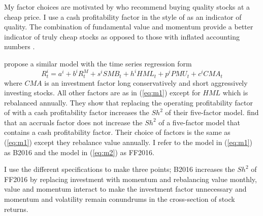 My factor choices are motivated by \textcite{graham1934security} who recommend buying
quality stocks at a cheap price. I use a cash profitability factor in the style of
\textcite{ball2016accruals} as an indicator of quality. The combination of fundamental
value and momentum provide a better indicator of truly cheap stocks as opposed to those
with inflated accounting numbers \textcite{kok2017facts}.

\textcite{fama2016choosing} propose a similar model with the time series regression form
\begin{equation} \label{eq:m2} R_t^i=a^i+b^iR_t^M+s^iSMB_t+h^iHML_t+p^iPMU_t+c^iCMA_t
\end{equation} where $CMA$ is an investment factor long conservatively and short
aggressively investing stocks. All other factors are as in (\ref{eq:m1}) except for $HML$
which is rebalanced annually. They show that replacing the operating profitability factor
of \textcite{fama2015five} with a cash profitability factor increases the $Sh^2$ of their
five-factor model. \textcite{ball2016accruals} find that an accruals factor does not
increase the $Sh^2$ of a five-factor model that contains a cash profitability factor.
Their choice of factors is the same as (\ref{eq:m1}) except they rebalance value annually.
I refer to the model in (\ref{eq:m1}) as B2016 and the model in (\ref{eq:m2}) as FF2016.

I use the different specifications to make three points; B2016 increases the $Sh^2$ of
FF2016 by replacing investment with momentum and rebalancing value monthly, value and
momentum interact to make the investment factor unnecessary and momentum and volatility
remain conundrums in the cross-section of stock returns.
